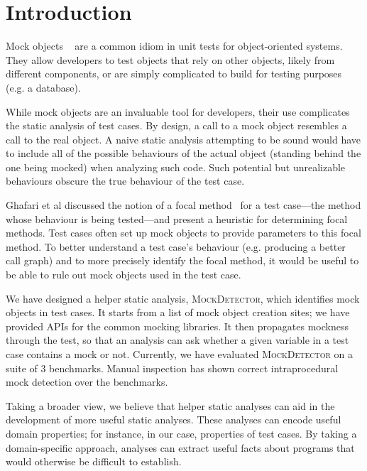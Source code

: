 \section{Introduction}
\label{sec:introduction}

Mock objects ~\cite{beck02:_test_driven_devel} are a common idiom in
unit tests for object-oriented systems.  They allow developers to test objects that 
rely on other objects, likely from different components, or are simply complicated 
to build for testing purposes (e.g. a database).

While mock objects are an invaluable tool for developers, their use
complicates the static analysis of test cases. 
By design, a call to a mock object resembles a call to the real object. 
A naive static analysis attempting to be sound would have to include all of 
the possible behaviours of the actual object (standing behind the one being mocked) when analyzing such code. 
Such potential but unrealizable behaviours obscure the true behaviour 
of the test case.

Ghafari et al discussed the notion of a focal method~\cite{ghafari15:_autom} for a test case---the method
whose behaviour is being tested---and present a heuristic for determining focal methods.
Test cases often set up mock objects to provide parameters to this focal method.
To better understand a test case's behaviour (e.g. producing a better call graph) 
and to more precisely identify the focal method,
it would be useful to be able to rule out mock objects used in the test case.


We have designed a helper static analysis, \textsc{MockDetector}, which identifies
mock objects in test cases. It starts from a list of mock object creation sites; we
have provided APIs for the common mocking libraries. It then propagates mockness
through the test, so that an analysis
can ask whether a given variable in a test case contains a mock or not. Currently, we have
evaluated \textsc{MockDetector} on a suite of 3 benchmarks. Manual inspection has shown 
correct intraprocedural mock detection over the benchmarks. 

Taking a broader view, we believe that helper static analyses can aid
in the development of more useful static analyses. These analyses can
encode useful domain properties; for instance, in our case, properties
of test cases. By taking a domain-specific approach, analyses can extract
useful facts about programs that would otherwise be difficult to establish.

